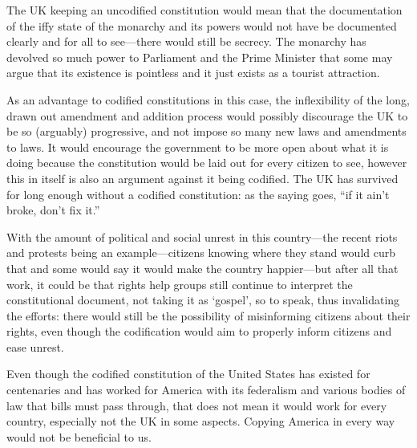 \documentclass[11pt,a4paper]{article}
\begin{document}
The UK keeping an uncodified constitution would mean that the documentation of the iffy state of the monarchy and its powers would not have be documented clearly and for all to see---there would still be secrecy.  The monarchy has devolved so much power to Parliament and the Prime Minister that some may argue that its existence is pointless and it just exists as a tourist attraction.

As an advantage to codified constitutions in this case, the inflexibility of the long, drawn out amendment and addition process would possibly discourage the UK to be so (arguably) progressive, and not impose so many new laws and amendments to laws.  It would encourage the government to be more open about what it is doing because the constitution would be laid out for every citizen to see, however this in itself is also an argument against it being codified.  The UK has survived for long enough without a codified constitution: as the saying goes, ``if it ain't broke, don't fix it.''

With the amount of political and social unrest in this country---the recent riots and protests being an example---citizens knowing where they stand would curb that and some would say it would make the country happier---but after all that work, it could be that rights help groups still continue to interpret the constitutional document, not taking it as `gospel', so to speak, thus invalidating the efforts: there would still be the possibility of misinforming citizens about their rights, even though the codification would aim to properly inform citizens and ease unrest.

Even though the codified constitution of the United States has existed for centenaries and has worked for America with its federalism and various bodies of law that bills must pass through, that does not mean it would work for every country, especially not the UK in some aspects.  Copying America in every way would not be beneficial to us.
\end{document}
